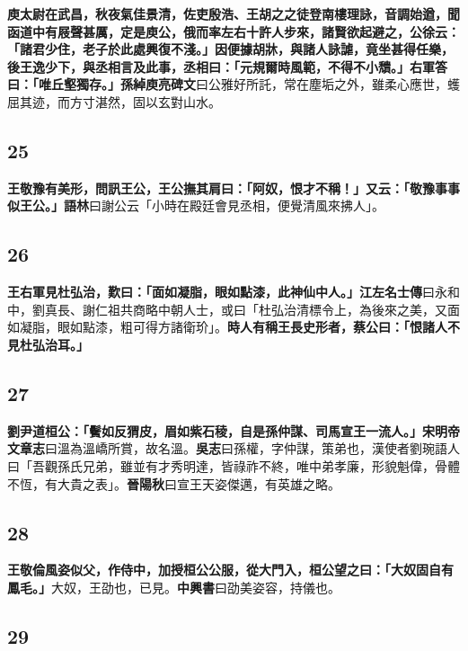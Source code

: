 \textbf{庾太尉在武昌，秋夜氣佳景清，佐吏殷浩、王胡之之徒登南樓理詠，音調始遒，聞函道中有屐聲甚厲，定是庾公，俄而率左右十許人步來，諸賢欲起避之，公徐云：「諸君少住，老子於此處興復不淺。」因便據胡牀，與諸人詠謔，竟坐甚得任樂，後王逸少下，與丞相言及此事，丞相曰：「元規爾時風範，不得不小穨。」右軍答曰：「唯丘壑獨存。」}{\footnotesize \textbf{孫綽庾亮碑文}曰公雅好所託，常在塵垢之外，雖柔心應世，蠖屈其迹，而方寸湛然，固以玄對山水。}

\subsection*{25}

\textbf{王敬豫有美形，問訊王公，王公撫其肩曰：「阿奴，恨才不稱！」又云：「敬豫事事似王公。」}{\footnotesize \textbf{語林}曰謝公云「小時在殿廷會見丞相，便覺清風來拂人」。}

\subsection*{26}

\textbf{王右軍見杜弘治，歎曰：「面如凝脂，眼如點漆，此神仙中人。」}{\footnotesize \textbf{江左名士傳}曰永和中，劉真長、謝仁祖共商略中朝人士，或曰「杜弘治清標令上，為後來之美，又面如凝脂，眼如點漆，粗可得方諸衛玠」。}\textbf{時人有稱王長史形者，蔡公曰：「恨諸人不見杜弘治耳。」}

\subsection*{27}

\textbf{劉尹道桓公：「鬢如反猬皮，眉如紫石稜，自是孫仲謀、司馬宣王一流人。」}{\footnotesize \textbf{宋明帝文章志}曰溫為溫嶠所賞，故名溫。\textbf{吳志}曰孫權，字仲謀，策弟也，漢使者劉琬語人曰「吾觀孫氏兄弟，雖並有才秀明達，皆祿祚不終，唯中弟孝廉，形貌魁偉，骨體不恆，有大貴之表」。\textbf{晉陽秋}曰宣王天姿傑邁，有英雄之略。}

\subsection*{28}

\textbf{王敬倫風姿似父，作侍中，加授桓公公服，從大門入，桓公望之曰：「大奴固自有鳳毛。」}{\footnotesize 大奴，王劭也，已見。\textbf{中興書}曰劭美姿容，持儀也。}

\subsection*{29}

